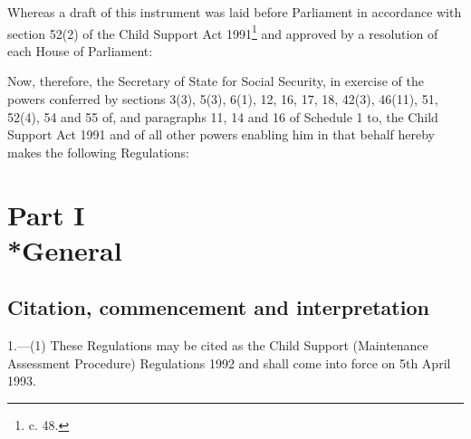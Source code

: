\documentclass[a4paper,12pt]{article}
\title{\regstitle}
\author{S.I. 1992 No. 1813}
\date{Made 20th July 1992\\Coming into force 5th April 1993}
\begin{document}
\maketitle


\medskip

\noindent
 Whereas a draft of this instrument was laid before Parliament in accordance with section 52(2) of the Child Support Act 1991\footnote{ c. 48.} and approved by a resolution of each House of Parliament:

 Now, therefore, the Secretary of State for Social Security, in exercise of the powers conferred by sections 3(3), 5(3), 6(1), 12, 16, 17, 18, 42(3), 46(11), 51, 52(4), 54 and 55 of, and paragraphs 11, 14 and 16 of Schedule 1 to, the Child Support Act 1991 and of all other powers enabling him in that behalf hereby makes the following Regulations:

{\sloppy

\tableofcontents

}

\setcounter{secnumdepth}{-2}

\section[Part I --- General]{Part I\\*General}

\renewcommand\parthead{--- Part I}

\subsection[1. Citation, commencement and interpretation]{Citation, commencement and interpretation}

1.—(1) These Regulations may be cited as the Child Support (Maintenance Assessment Procedure) Regulations 1992 and shall come into force on 5th April 1993.
\end{document}
